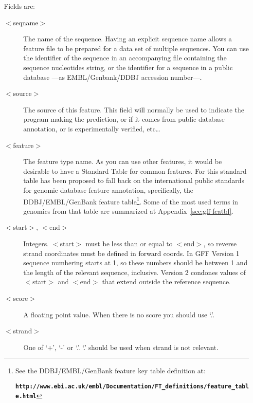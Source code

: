 
Fields are:\\[1ex]
\centerline{\small\hspace{-0.25cm}}

\begin{description}
\item[$<$seqname$>$] The name of the sequence. Having an explicit sequence name allows a feature file to be prepared for a data set of multiple sequences. You can use the identifier of the sequence in an accompanying file containing the sequence nucleotides string, or the identifier for a sequence in a public database ---as EMBL/Genbank/DDBJ accession number---.
\item[$<$source$>$] The source of this feature. This field will normally be used to indicate the program making the prediction, or if it comes from public database annotation, or is experimentally verified, etc\ldots
\item[$<$feature$>$] The feature type name. As you can use other features, it would be desirable to have a Standard Table for common features. For this standard table has been proposed to fall back on the international public standards for genomic database feature annotation, specifically, the DDBJ/EMBL/GenBank feature table\footnote{See the DDBJ/EMBL/GenBank feature key table definition at:\\\centerline{\bfseries\texttt{http://www.ebi.ac.uk/embl/Documentation/FT\_definitions/feature\_table.html}}}. Some of the most used terms in genomics from that table are summarized at Appendix~\ref{sec:gff-featbl}.
\item[$<$start$>$, $<$end$>$] Integers. $<$start$>$ must be less than or equal to $<$end$>$, so reverse strand coordinates must be defined in forward coords. In GFF Version 1 sequence numbering starts at 1, so these numbers should be between 1 and the length of the relevant sequence, inclusive. Version 2 condones values of $<$start$>$ and $<$end$>$ that extend outside the reference sequence. 
\item[$<$score$>$] A floating point value. When there is no score you should use `.'.
\item[$<$strand$>$] One of `+', `-' or `.'. `.' should be used when strand is not relevant.

\end{description}
